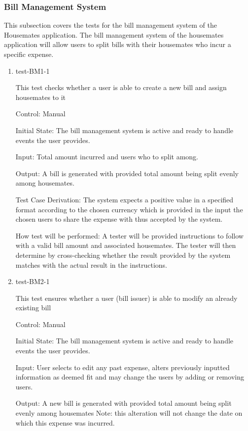 \documentclass[12pt, titlepage]{article}
\begin{document}
\subsubsection{Bill Management System}

This subsection covers the tests for the bill management system of the Housemates application. The bill management system of the housemates application will allow users to split bills with their housemates who incur a specific expense.

\begin{enumerate}

\item{test-BM1-1\\}

This test checks whether a user is able to create a new bill and assign housemates to it

Control: Manual
					
Initial State: The bill management system is active and ready to handle events the user provides.
					
Input: Total amount incurred and users who to split among.
					
Output: A bill is generated with provided total amount being split evenly among housemates.

Test Case Derivation: The system expects a positive value in a specified format according to the chosen currency which is provided in the input the chosen users to share the expense with thus accepted by the system.
					
How test will be performed: A tester will be provided instructions to follow with a valid bill amount and associated housemates. The tester will then determine by cross-checking whether the result provided by the system matches with the actual result in the instructions.
					
\item{test-BM2-1\\}

This test ensures whether a user (bill issuer) is able to modify an already existing bill

Control: Manual
					
Initial State: The bill management system is active and ready to handle events the user provides.
					
Input: User selects to edit any past expense, alters previously inputted information as deemed fit and may change the users by adding or removing users. 
					
Output: A new bill is generated with provided total amount being split evenly among housemates Note: this alteration will not change the date on which this expense was incurred.


\end{enumerate}
\end{document}
